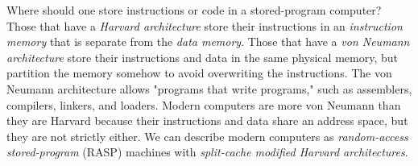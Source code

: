 Where should one store instructions or code in a stored-program computer? Those that have a \textit{Harvard architecture} store their instructions in an \textit{instruction memory} that is separate from the \textit{data memory}. Those that have a \textit{von Neumann architecture} store their instructions and data in the same physical memory, but partition the memory somehow to avoid overwriting the instructions. The von Neumann architecture allows "programs that write programs," such as assemblers, compilers, linkers, and loaders. Modern computers are more von Neumann than they are Harvard because their instructions and data share an address space, but they are not strictly either. We can describe modern computers as \textit{random-access stored-program} (RASP) machines with \textit{split-cache modified Harvard architectures}. \\

